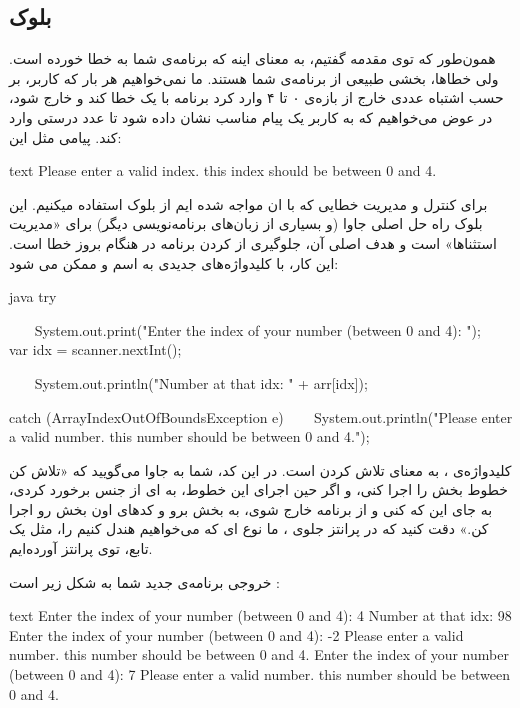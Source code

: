 \subsection{بلوک }

همون‌طور که توی مقدمه گفتیم،  به معنای اینه که برنامه‌ی شما
به خطا خورده است. ولی خطاها، بخشی طبیعی از برنامه‌ی شما هستند. ما
نمی‌خواهیم هر بار که کاربر، بر حسب اشتباه عددی خارج از بازه‌ی ۰ تا ۴ وارد
کرد برنامه با یک خطا  کند و خارج شود، در عوض می‌خواهیم که به
کاربر یک پیام مناسب نشان داده شود تا عدد درستی وارد کند. پیامی مثل این:

\begin{codebox}{text}
Please enter a valid index. this index should be between 0 and 4.
\end{codebox}

برای کنترل و مدیریت خطایی که با ان مواجه شده ایم از بلوک 
استفاده میکنیم. این بلوک راه حل اصلی جاوا (و بسیاری از زبان‌های
برنامه‌نویسی دیگر) برای «مدیریت استثناها»  است
و هدف اصلی آن، جلوگیری از  کردن برنامه در هنگام بروز خطا است.
این کار، با کلیدواژه‌های جدیدی به اسم  و
 ممکن می شود:

\begin{codebox}{java}
try {  
    System.out.print("Enter the index of your number (between 0 and 4): ");
    var idx = scanner.nextInt();  
  
    System.out.println("Number at that idx: " + arr[idx]);  
} catch (ArrayIndexOutOfBoundsException e) {  
    System.out.println("Please enter a valid number. this number should be between 0 and 4.");  
}
\end{codebox}

کلیدواژه‌ی  ، به معنای تلاش کردن است. در این کد، شما به
جاوا می‌گویید که «تلاش کن خطوط بخش  را اجرا کنی، و اگر
حین اجرای این خطوط، به  ای از جنس
 برخورد کردی، به جای این که
 کنی و از برنامه خارج شوی، به بخش  برو و
کدهای اون بخش رو اجرا کن.» دقت کنید که در پرانتز جلوی
 ، ما نوع  ای که می‌خواهیم هندل کنیم را،
مثل یک تابع، توی پرانتز آورده‌ایم.

خروجی برنامه‌ی جدید شما به شکل زیر است :

\begin{codebox}{text}
Enter the index of your number (between 0 and 4): 4  
Number at that idx: 98  
Enter the index of your number (between 0 and 4): -2  
Please enter a valid number. this number should be between 0 and 4.  
Enter the index of your number (between 0 and 4): 7  
Please enter a valid number. this number should be between 0 and 4.
\end{codebox}


